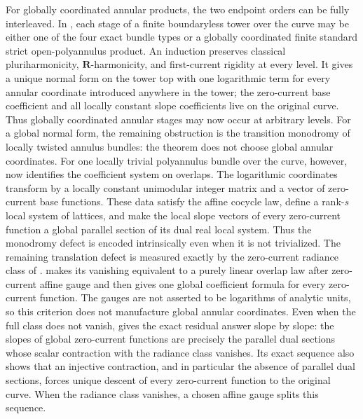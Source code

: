 For globally coordinated annular products, the two endpoint orders can be
fully interleaved.  In
, each stage of a
finite boundaryless tower over the curve may be either one of the four exact
bundle types or a globally coordinated finite standard strict
open-polyannulus product.  An induction preserves classical
pluriharmonicity, \(\mathbf R\)-harmonicity, and first-current rigidity at
every level.  It gives a unique normal form on the tower top with one
logarithmic term for every annular coordinate introduced anywhere in the
tower; the zero-current base coefficient and all locally constant slope
coefficients live on the original curve.  Thus globally coordinated annular
stages may now occur at arbitrary levels.  For a global normal form, the
remaining obstruction is the transition monodromy of locally twisted annulus
bundles: the theorem does not choose global annular coordinates.  For one
locally trivial polyannulus bundle over the curve, however,
 now identifies the
coefficient system on overlaps.  The logarithmic coordinates transform by a
locally constant unimodular integer matrix and a vector of zero-current base
functions.  These data satisfy the affine cocycle law, define a rank-\(s\)
local system of lattices, and make the local slope vectors of every
zero-current function a global parallel section of its dual real local
system.  Thus the monodromy defect is encoded intrinsically even when it is
not trivialized.  The remaining translation defect is measured exactly by
the zero-current radiance class of
.
 makes its vanishing
equivalent to a purely linear overlap law after zero-current affine gauge
and then gives one global coefficient formula for every zero-current
function.  The gauges are not asserted to be logarithms of analytic units,
so this criterion does not manufacture global annular coordinates.
Even when the full class does not vanish,
 gives the exact residual
answer slope by slope: the slopes of global zero-current functions are
precisely the parallel dual sections whose scalar contraction with the
radiance class vanishes.  Its exact sequence also shows that an injective
contraction, and in particular the absence of parallel dual sections,
forces unique descent of every zero-current function to the original curve.
When the radiance class vanishes, a chosen affine gauge splits this sequence.

